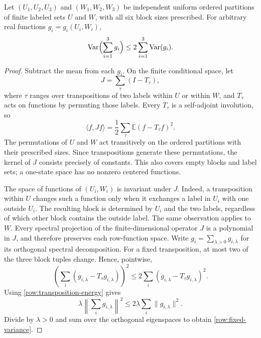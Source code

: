 \begin{lemma}\label{row:fixed-blocks}
Let $(U_1,U_2,U_3)$ and $(W_1,W_2,W_3)$ be independent uniform ordered
partitions of finite labeled sets $U$ and $W$, with all six block sizes
prescribed.  For arbitrary real functions $g_i=g_i(U_i,W_i)$,
\begin{equation}\label{row:fixed-variance}
 \operatorname{Var}\Bigl(\sum_{i=1}^3 g_i\Bigr)
 \le 2\sum_{i=1}^3\operatorname{Var}(g_i).
\end{equation}
\end{lemma}
\begin{proof}
Subtract the mean from each $g_i$.  On the finite conditional space, let
\[
 J=\sum_{\tau}(I-T_\tau),
\]
where $\tau$ ranges over transpositions of two labels within $U$ or
within $W$, and $T_\tau$ acts on functions by permuting those labels.
Every $T_\tau$ is a self-adjoint involution, so
\begin{equation}\label{row:transposition-energy}
 \langle f,Jf\rangle
 =\frac12\sum_\tau\mathbb E(f-T_\tau f)^2.
\end{equation}
The permutations of $U$ and $W$ act transitively on the ordered
partitions with their prescribed sizes.  Since transpositions generate
these permutations, the kernel of $J$ consists precisely of constants.
This also covers empty blocks and label sets; a one-state space has no
nonzero centered functions.

The space of functions of $(U_i,W_i)$ is invariant under $J$.
Indeed, a transposition within $U$ changes such a function only when it
exchanges a label in $U_i$ with one outside $U_i$.  The resulting block
is determined by $U_i$ and the two labels, regardless of which other
block contains the outside label.  The same observation applies to $W$.
Every spectral projection of the finite-dimensional operator $J$ is a
polynomial in $J$, and therefore preserves each row-function space.
Write $g_i=\sum_{\lambda>0}g_{i,\lambda}$ for its orthogonal spectral
decomposition.  For a fixed transposition, at most two of the three
block tuples change.  Hence, pointwise,
\[
 \left(\sum_i(g_{i,\lambda}-T_\tau g_{i,\lambda})\right)^2
 \le 2\sum_i(g_{i,\lambda}-T_\tau g_{i,\lambda})^2.
\]
Using \eqref{row:transposition-energy} gives
\[
 \lambda\left\|\sum_i g_{i,\lambda}\right\|^2
 \le 2\lambda\sum_i\|g_{i,\lambda}\|^2.
\]
Divide by $\lambda>0$ and sum over the orthogonal eigenspaces to obtain
\eqref{row:fixed-variance}.
\end{proof}


